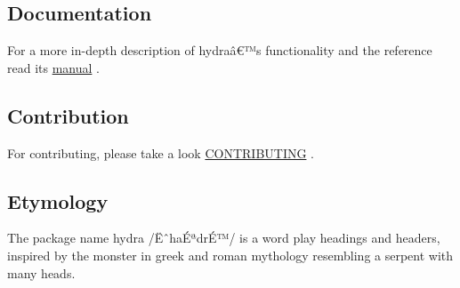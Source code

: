 \begin{Shaded}
\begin{Highlighting}[]

\NormalTok{  \}}
\NormalTok{\})}


\end{Highlighting}
\end{Shaded}


\subsection{Documentation}\label{documentation}

For a more in-depth description of hydraâ€™s functionality and the
reference read its
\href{https://github.com/typst/packages/raw/main/packages/preview/hydra/0.5.1/doc/manual.pdf}{manual}
.

\subsection{Contribution}\label{contribution}

For contributing, please take a look
\href{https://github.com/typst/packages/raw/main/packages/preview/hydra/0.5.1/CONTRIBUTING.md}{CONTRIBUTING}
.

\subsection{Etymology}\label{etymology}

The package name hydra /ËˆhaÉªdrÉ™/ is a word play headings and headers,
inspired by the monster in greek and roman mythology resembling a
serpent with many heads.

